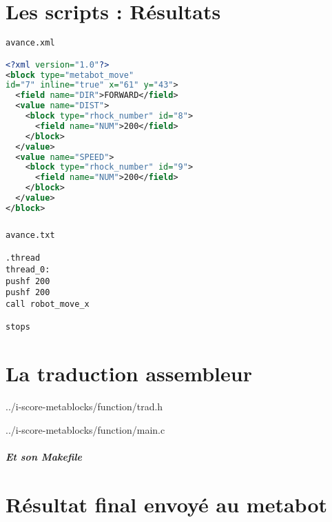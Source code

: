 \documentclass[10pt,a4paper]{report}
\begin{document}
\begin{appendices}



\chapter{Les scripts : Résultats} 
\begin{lstlisting}[language=xml, frame=none]
avance.xml

<?xml version="1.0"?>
<block type="metabot_move" 
id="7" inline="true" x="61" y="43">
  <field name="DIR">FORWARD</field>
  <value name="DIST">
    <block type="rhock_number" id="8">
      <field name="NUM">200</field>
    </block>
  </value>
  <value name="SPEED">
    <block type="rhock_number" id="9">
      <field name="NUM">200</field>
    </block>
  </value>
</block>
\end{lstlisting}
\paragraph{}

\begin{verbatim}
avance.txt

.thread
thread_0:
pushf 200
pushf 200
call robot_move_x

stops 
\end{verbatim}
\chapter{La traduction assembleur} 





{../i-score-metablocks/function/trad.h}
\newpage



{../i-score-metablocks/function/main.c}

\paragraph{Et son Makefile}


\chapter{Résultat final envoyé au metabot} 


\end{appendices} 
\end{document}
